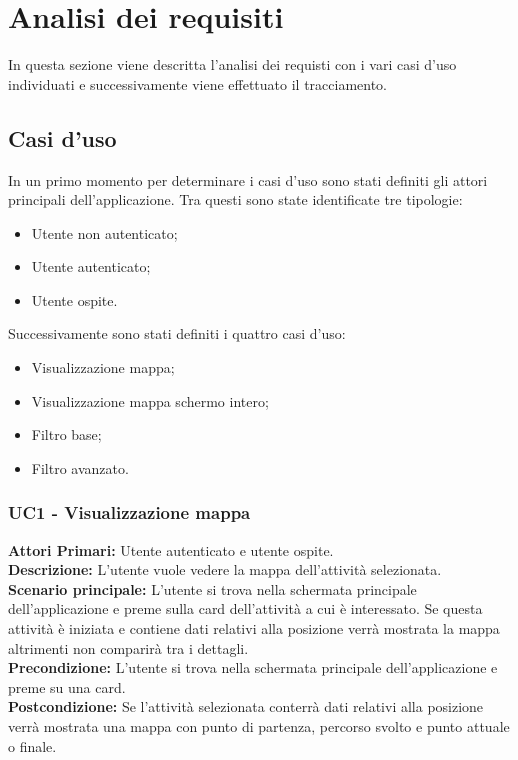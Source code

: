 \section{Analisi dei requisiti}
In questa sezione viene descritta l'analisi dei requisti con i  vari casi d'uso individuati e successivamente viene effettuato il tracciamento.

\subsection{Casi d'uso}
In un primo momento per determinare i casi d'uso sono stati definiti gli attori principali dell'applicazione.
Tra questi sono state identificate tre tipologie:
\begin{itemize}
	\item Utente non autenticato;
	\item Utente autenticato;
	\item Utente ospite.
\end{itemize}
Successivamente sono stati definiti i quattro casi d'uso:
\begin{itemize}
	\item Visualizzazione mappa;
	\item Visualizzazione mappa schermo intero;
	\item Filtro base;
	\item Filtro avanzato.
\end{itemize}


\subsubsection{ UC1 - Visualizzazione mappa}

	\textbf{Attori Primari:} Utente autenticato e utente ospite.\\
	\textbf{Descrizione:} L'utente vuole vedere la mappa dell'attività selezionata.\\
	\textbf{Scenario principale:} L'utente si trova nella schermata principale dell'applicazione e preme sulla card dell'attività a cui è interessato. Se questa attività è iniziata e contiene dati relativi alla posizione verrà mostrata la mappa altrimenti non comparirà tra i dettagli.\\
	\textbf{Precondizione:} L'utente si trova nella schermata principale dell'applicazione e preme su una card.\\
	\textbf{Postcondizione:} Se l'attività selezionata conterrà dati relativi alla posizione verrà mostrata una mappa con punto di partenza, percorso svolto e punto attuale o finale.\\


